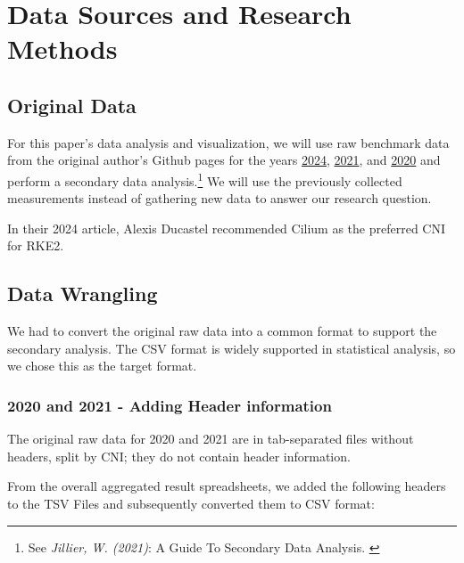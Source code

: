%
%

\pagebreak
\section{Data Sources and Research Methods}

\onehalfspacing

\subsection{Original Data}

For this paper's data analysis and visualization, we will use raw benchmark data from the original author's Github pages for the years \href{https://github.com/InfraBuilder/benchmark-k8s-cni-2024-01}{2024}, \href{https://github.com/InfraBuilder/benchmark-k8s-cni-2021-05}{2021}, and \href{https://github.com/InfraBuilder/benchmark-k8s-cni-2020-08}{2020} and perform a secondary data analysis.\footnote{See \textit{Jillier, W. (2021)}: A Guide To Secondary Data Analysis. \cite{secondaryDA}} We will use the previously collected measurements instead of gathering new data to answer our research question.

In their 2024 article, Alexis Ducastel recommended Cilium as the preferred CNI for RKE2.

\subsection{Data Wrangling}

We had to convert the original raw data into a common format to support the secondary analysis. The CSV format is widely supported in statistical analysis, so we chose this as the target format.

\subsubsection{2020 and 2021 - Adding Header information}

The original raw data for 2020 and 2021 are in tab-separated files without headers, split by CNI; they do not contain header information.

From the overall aggregated result spreadsheets, we added the following headers to the TSV Files and subsequently converted them to CSV format:

